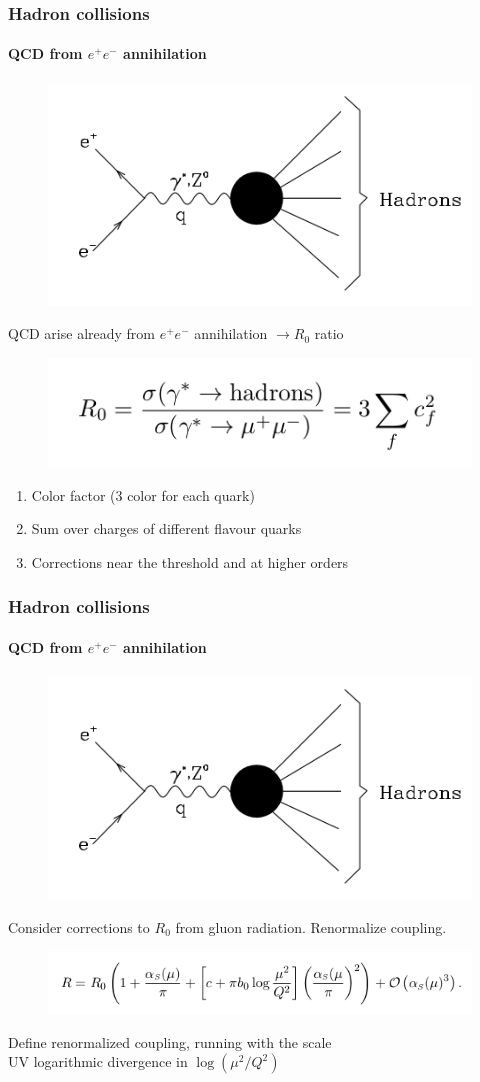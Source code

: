 \documentclass[aspectratio=43]{beamer}
\begin{document}
\begin{frame}

	\frametitle{Hadron collisions}
	\framesubtitle{QCD from $e^{+}e^{-}$ annihilation}

	\begin{figure}
		\includegraphics[width = 5 cm]{plots/ee_hadrons.png}
	\end{figure}
 
	QCD arise already from $e^{+}e^{-}$ annihilation $\rightarrow R_{0}$ ratio
	\begin{figure}
		\includegraphics[width = 6 cm]{plots/eq_R0.png}
	\end{figure}

	\begin{enumerate}
		\item Color factor (3 color for each quark)
		\item Sum over charges of different flavour quarks
		\item Corrections near the threshold and at higher orders

	\end{enumerate}	
	
\end{frame}

\begin{frame}

	\frametitle{Hadron collisions}
	\framesubtitle{QCD from $e^{+}e^{-}$ annihilation}
	
	\begin{figure}
		\includegraphics[width = 5 cm]{plots/ee_hadrons.png}
	\end{figure}	
	
	Consider corrections to $R_{0}$ from gluon radiation. Renormalize coupling.
	\begin{figure}
		\includegraphics[width = 10 cm]{plots/eq_R0_3.png}
	\end{figure}

	Define renormalized coupling, running with the scale \\
	UV logarithmic divergence in $\log(\mu^{2} / Q^{2})$
\end{frame}
\end{document}
